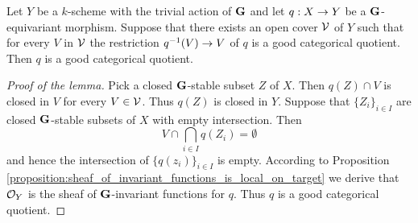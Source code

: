 \begin{lemma}\label{lemma:good_categorical_quotients_are_local_on_the_target}
Let $Y$ be a $k$-scheme with the trivial action of $\mathbf{G}$ and let $q:X\rightarrow Y$ be a $\mathbf{G}$-equivariant morphism. Suppose that there exists an open cover ${\mathcal V}$ of $Y$ such that for every $V$ in ${\mathcal V}$ the restriction $q^{-1}(V)\rightarrow V$ of $q$ is a good categorical quotient. Then $q$ is a good categorical quotient.
\end{lemma}
\begin{proof}[Proof of the lemma]
Pick a closed $\mathbf{G}$-stable subset $Z$ of $X$. Then $q(Z) \cap V$ is closed in $V$ for every $V\in {\mathcal V}$. Thus $q(Z)$ is closed in $Y$. Suppose that $\{Z_i\}_{i\in I}$ are closed $\mathbf{G}$-stable subsets of $X$ with empty intersection. Then 
$$V\cap \bigcap_{i\in I}q(Z_i) = \emptyset$$
and hence the intersection of $\{q(z_i)\}_{i\in I}$ is empty. According to Proposition \ref{proposition:sheaf_of_invariant_functions_is_local_on_target} we derive that ${\mathcal O}_Y$ is the sheaf of $\mathbf{G}$-invariant functions for $q$. Thus $q$ is a good categorical quotient.
\end{proof}
    
